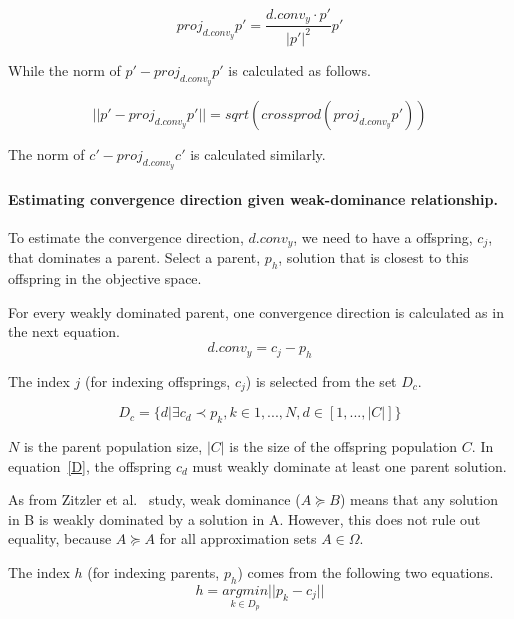 \begin{equation}
proj_{d.conv_{y}}p \prime = \frac {{d.conv_{y}} \cdot {p \prime}} {|{p \prime}|^2}{{p \prime}} 
\end{equation}

While the norm of $p \prime - proj_{d.conv_{y}}p \prime$ is calculated as follows.


\begin{equation}
||p \prime - proj_{d.conv_{y}}p \prime|| = sqrt(crossprod(proj_{d.conv_{y}}p \prime))
\end{equation}

The norm of $c \prime - proj_{d.conv_{y}}c \prime$ is calculated similarly.



\paragraph{Estimating convergence direction given weak-dominance relationship.}To estimate the convergence direction, $d.conv_{y}$, we need to have a offspring, $c_j$, that dominates a parent. Select a parent, $p_h$, solution that is closest to this offspring in the objective space. 

For every weakly dominated parent, one convergence direction is calculated as in the next equation.
\begin{equation}
\label{1}
	d.conv_{y} = c_j - p_h
\end{equation}

The index $j$ (for indexing offsprings, $c_j$) is selected from the set $D_c$.

\begin{equation}
\label{D}
	D_c = \{d| \exists c_d \prec p_k, k \in {1,..., N}, d \in [1,..., |C|]\}
\end{equation}

$N$ is the parent population size, $|C|$ is the size of the offspring population $C$. In equation~\ref{D}, the offspring $c_d$ must weakly dominate at least one parent solution. 

As from Zitzler et al.~\cite{zitzler2003performance} study, weak dominance ($A \succeq B$) means that any solution in B is weakly dominated by a solution in A. However, this does not rule out equality, because $A \succeq A$ for all approximation sets $A \in \Omega$.

The index $h$ (for indexing parents, $p_h$) comes from the following two equations.
\begin{equation}
h = \underset{k \in D_p }{argmin} || p_k - c_j ||
\end{equation}

